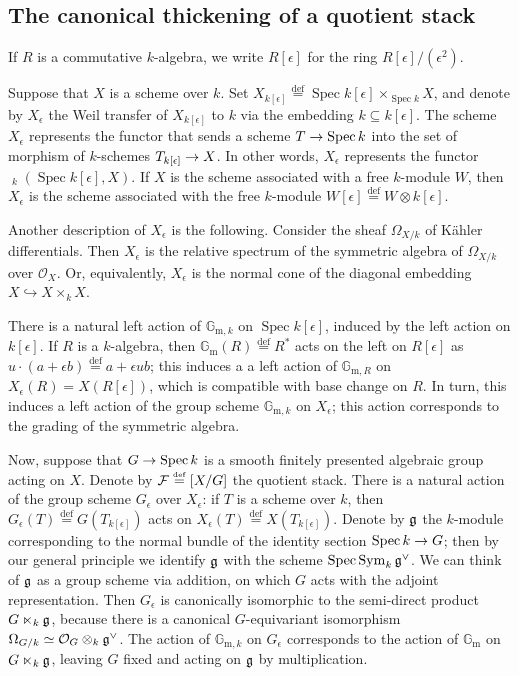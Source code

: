 \documentclass{amsart}
\numberwithin{equation}{section}
\numberwithin{subsection}{section}
\theoremstyle{definition}
\theoremstyle{remark}
\newcommand\cO{\mathcal{O}} \newcommand\cP{\mathcal{P}}
\newcommand\arr{\ifinner\to\else\longrightarrow\fi}
\newcommand\eqdef{\overset{\mathrm{\scriptscriptstyle def}} =}
\newcommand\into{\hookrightarrow}
\newcommand\spec{\operatorname{Spec}}
\newcommand{\underhom}
{\mathop{\underline{\mathrm{Hom}}}\nolimits}
\newcommand{\gm}{\mathbb{G}_{\mathrm{m}}}
\newcommand{\gms}[1]{\mathbb{G}_{\mathrm{m}, #1}}
\newcommand{\sym}{\operatorname{Sym}}
\newcommand{\dual}{^{\vee}}
\begin{document}
\subsection{The canonical thickening of a quotient stack}

If $R$ is a commutative $k$-algebra, we write $R[\epsilon]$ for the ring $R[\epsilon]/(\epsilon^{2})$.

Suppose that $X$ is a scheme over $k$. Set $X_{k[\epsilon]} \eqdef \spec k[{\epsilon}] \times_{\spec k} X$, and denote by $X_{\epsilon}$ the Weil transfer of $X_{k[\epsilon]}$ to $k$ via the embedding $k \subseteq k[\epsilon]$. The scheme $X_{\epsilon}$ represents the functor that sends a scheme $T \arr \spec k$ into the set of morphism of $k$-schemes $T_{k[\epsilon]} \arr X$. In other words, $X_{\epsilon}$ represents the functor $\underhom_{k}(\spec k[\epsilon], X)$. If $X$ is the scheme associated with a free $k$-module $W$, then $X_{\epsilon}$ is the scheme associated with the free $k$-module $W[\epsilon] \eqdef W \otimes k[\epsilon]$. 

Another description of $X_{\epsilon}$ is the following. Consider the sheaf $\Omega_{X/k}$ of K\"{a}hler differentials. Then $X_{\epsilon}$ is the relative spectrum of the symmetric algebra of $\Omega_{X/k}$ over $\cO_{X}$. Or, equivalently, $X_{\epsilon}$ is the normal cone of the diagonal embedding $X \into X\times_{k}X$.

There is a natural left action of $\gms{k}$ on $\spec k[\epsilon]$, induced by the left action on $k[\epsilon]$. If $R$ is a $k$-algebra, then $\gm(R)\eqdef R^{*}$ acts on the left on $R[\epsilon]$ as $u\cdot(a+\epsilon b) \eqdef a + \epsilon ub$; this induces a a left action of $\gms{R}$ on $X_\epsilon(R) = X(R[\epsilon])$, which is compatible with base change on $R$. In turn, this induces a left action of the group scheme $\gms{k}$ on $X_{\epsilon}$; this action corresponds to the grading of the symmetric algebra.

Now, suppose that $G \arr \spec k$ is a smooth finitely presented algebraic group acting on $X$. Denote by $\cF \eqdef [X/G]$ the quotient stack. There is a natural action of the group scheme $G_{\epsilon}$ over $X_{\epsilon}$: if $T$ is a scheme over $k$, then $G_{\epsilon}(T) \eqdef G(T_{k[\epsilon]})$ acts on $X_{\epsilon}(T) \eqdef X(T_{k[\epsilon]})$. Denote by $\mathfrak{g}$ the $k$-module corresponding to the normal bundle of the identity section $\spec k \arr G$; then by our general principle we identify $\mathfrak{g}$ with the scheme $\spec\sym_{k}\frg\dual$. We can think of $\mathfrak{g}$ as a group scheme via addition, on which $G$ acts with the adjoint representation. Then $G_{\epsilon}$ is canonically isomorphic to the semi-direct product $G\ltimes_{k} \mathfrak{g}$, because there is a canonical $G$-equivariant isomorphism $\Omega_{G/k} \simeq \cO_{G}\otimes_{k}\frg\dual$. The action of $\gms k$ on $G_{\epsilon}$ corresponds to the action of $\gm$ on $G\ltimes_{k} \mathfrak{g}$, leaving $G$ fixed and acting on $\mathfrak{g}$ by multiplication.
\end{document}
